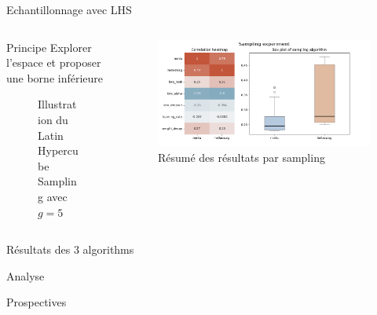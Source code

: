 \begin{frame}{Echantillonnage avec LHS}
    \begin{columns}
        \begin{column}{0.4\textwidth} 
            \begin{block}{Principe}
                Explorer l'espace et proposer une borne inférieure
                
            \end{block}
            \begin{figure}
                \centering
                
                \caption{Illustration du Latin Hypercube Sampling avec $g=5$}
            \end{figure} 
     
            \end{column}
                 
            \begin{column}{0.6\textwidth}
                \begin{figure}
                    \centering
                    \includegraphics[width = \textwidth]{assets/imgs/lhs.png}
                    \caption{Résumé des résultats par sampling}
                \end{figure} 
            \end{column}
                 
    \end{columns}
\end{frame}

\begin{frame}{Résultats des 3 algorithms}
    
\end{frame}

\begin{frame}{Analyse}
    
\end{frame}

\begin{frame}{Prospectives}
    
\end{frame}